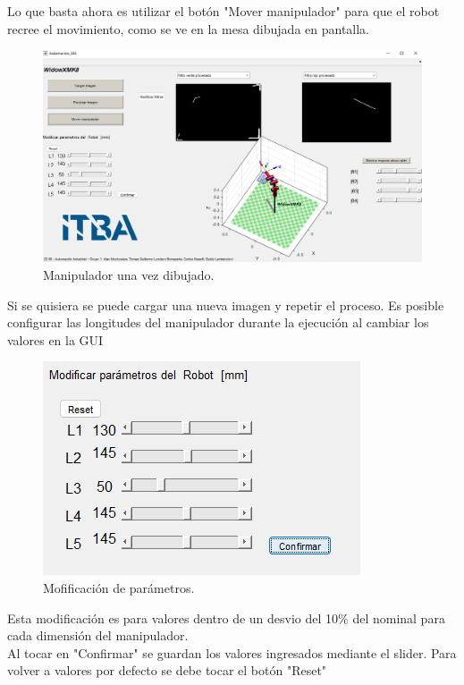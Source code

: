 Lo que basta ahora es utilizar el bot\'on "Mover manipulador" para que el robot recree el movimiento, como se ve en la mesa dibujada en pantalla.
\begin{figure}[H]
	\centering
	\includegraphics[width=\linewidth]{linea}
	\caption{Manipulador una vez dibujado.}	
	\label{fig:linea}
\end{figure}
Si se quisiera se puede cargar una nueva imagen y repetir el proceso.
Es posible configurar las longitudes del manipulador durante la ejecuci\'on al cambiar los valores en la GUI
\begin{figure}[H]
	\centering
	\includegraphics[width=0.35\linewidth]{mm}
	\caption{Mofificaci\'on de par\'ametros.}	
	\label{fig:mm}
\end{figure}
Esta modificaci\'on es para valores dentro de un desvio del 10$\%$ del nominal para cada dimensi\'on del manipulador.\\
Al tocar en "Confirmar" se guardan los valores ingresados mediante el slider.
Para volver a valores por defecto se debe tocar el bot\'on "Reset"

